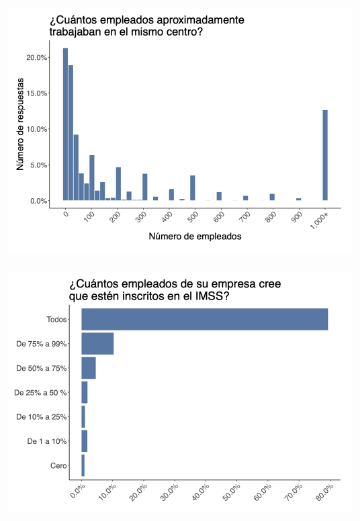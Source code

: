\documentclass[oneside,11pt]{article}
\begin{document}
\begin{figure}[H]
\begin{center}
    \begin{subfigure}{0.49\textwidth}
    \includegraphics[width=\textwidth]{04_Figures/worker_survey/Exp_11.png}
    \end{subfigure}
    \begin{subfigure}{0.49\textwidth}
    \includegraphics[width=\textwidth]{04_Figures/worker_survey/Exp_12.png}
    \end{subfigure}
    
    \end{center}
\end{figure}

\clearpage
\end{document}
